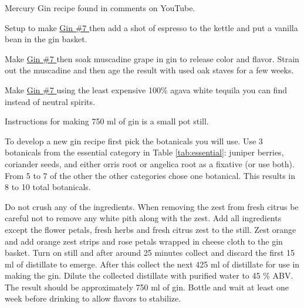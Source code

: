 \documentclass[letterpaper]{recipePMG}
\begin{document}

Mercury Gin recipe found in comments on YouTube.


Setup to make \hyperref[GinNumber7]{Gin \#7 } then add a shot of espresso to the kettle and put a vanilla bean in the gin basket.


Make \hyperref[GinNumber7]{Gin \#7 } then soak muscadine grape in gin to release color and flavor. Strain out the muscadine and then age the result with used oak staves for a few weeks.


Make \hyperref[GinNumber7]{Gin \#7 } using the least expensive 100\% agava white tequila you can find instead of neutral spirits.




\newpage


Instructions for making 750 ml of gin is a small pot still.

To develop a new gin recipe first pick the botanicals you will use.  Use 3 botanicals from the essential category in Table \ref{tab:essential}: juniper berries, coriander seeds, and either orris root or angelica root as a fixative (or use both).  From 5 to 7 of the other the other categories chose one botanical. This results in 8 to 10 total botanicals. 

Do not crush any of the ingredients. When removing the zest from fresh citrus be careful not to remove any white pith along with the zest. Add all ingredients except the flower petals, fresh herbs and fresh citrus zest to the still.  Zest orange and add orange zest strips and rose petals wrapped in cheese cloth to the gin basket.  Turn on still and after around 25 minutes collect and discard the first 15 ml of distillate to emerge. After this collect the next 425 ml of distillate for use in making the gin. Dilute the collected distillate with purified water to 45 \% ABV. The result should be approximately 750 ml of gin. Bottle and wait at least one week before drinking to allow flavors to stabilize.
\end{document}
